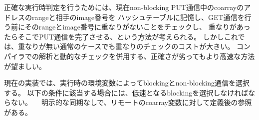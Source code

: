 正確な実行時判定を行うためには、現在non-blocking PUT通信中のcoarrayのアドレスのrangeと相手のimage番号を
ハッシュテーブルに記憶し、GET通信を行う前にそのrangeとimage番号に重なりがないことをチェックし、
重なりがあったらそこでPUT通信を完了させる、という方法が考えられる。
しかしこれでは、重なりが無い通常のケースでも重なりのチェックのコストが大きい。
コンパイラでの解析と動的なチェックを併用する、正確さが劣ってもより高速な方法が望ましい。

現在の実装では、実行時の環境変数によってblockingとnon-blocking通信を選択する。
以下の条件に該当する場合には、低速となるblockingを選択しなければならない。
　明示的な同期なしで、リモートのcoarray変数に対して定義後の参照がある。




